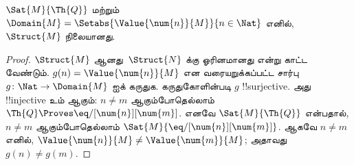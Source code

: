 \documentclass[../../../include/open-logic-section]{subfiles}
\begin{document}
\begin{prop}
$\Sat{M}{\Th{Q}}$ மற்றும் $\Domain{M} =
\Setabs{\Value{\num{n}}{M}}{n
  \in \Nat}$ எனில், $\Struct{M}$ நிலையானது.
\end{prop}

\begin{proof}
$\Struct{M}$ ஆனது~$\Struct{N}$ க்கு ஓரினமானது என்று காட்ட வேண்டும்.
$g(n) = \Value{\num{n}}{M}$ என வரையறுக்கப்பட்ட சார்பு
$g\colon \Nat \to \Domain{M}$ ஐக் கருதுக. கருதுகோளின்படி $g$
!!{surjective}. அது !!{injective} உம் ஆகும்: $n \neq m$ ஆகும்போதெல்லாம்
$\Th{Q} \Proves
\eq/[\num{n}][\num{m}]$. எனவே $\Sat{M}{\Th{Q}}$ என்பதால்,
$n \neq
m$ ஆகும்போதெல்லாம் $\Sat{M}{\eq/[\num{n}][\num{m}]}$. ஆகவே
$n \neq m$ எனில், $\Value{\num{n}}{M} \neq
\Value{\num{m}}{M}$; அதாவது $g(n) \neq g(m)$.


\end{proof}
\end{document}
